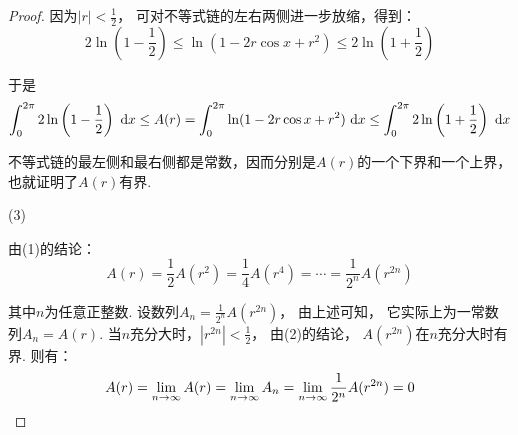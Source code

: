 \begin{proof}
因为$|r|<\frac{1}{2}$，
可对不等式链的左右两侧进一步放缩，得到：
$$
2\ln \left( 1-\frac{1}{2} \right) \le \ln(1-2r \cos x +r^2) \le 2\ln \left( 1+\frac{1}{2} \right)
$$

于是
$$
\int_{0}^{2\pi} 2\ln \left( 1-\frac{1}{2} \right) ~\mathrm{d} x
\le A(r) = \int_{0}^{2\pi} \ln ( 1- 2r \cos x +r^2) ~\mathrm{d} x
\le \int_{0}^{2\pi} 2\ln \left( 1+\frac{1}{2} \right) ~\mathrm{d} x
$$ \par
不等式链的最左侧和最右侧都是常数，因而分别是$A(r)$的一个下界和一个上界，也就证明了$A(r)$有界. \par

(3)

由(1)的结论：
$$
A(r) = \frac{1}{2} A(r^2) = \frac{1}{4}A(r^4) = \cdots = \frac{1}{2^n}A(r^{2n})
$$

其中$n$为任意正整数.
设数列$A_{n}=\frac{1}{2^n}A(r^{2n})$，
由上述可知，
它实际上为一常数列$A_{n}=A(r)$.
当$n$充分大时，$|r^{2n}|<\frac{1}{2}$，
由(2)的结论，
$A(r^{2n})$在$n$充分大时有界. 则有：
$$
A(r) = \lim\limits_{n \to \infty} A(r) = \lim\limits_{n \to \infty} A_{n} = \lim\limits_{n \to \infty} \frac{1}{2^n}A(r^{2n}) = 0
$$
\end{proof}
